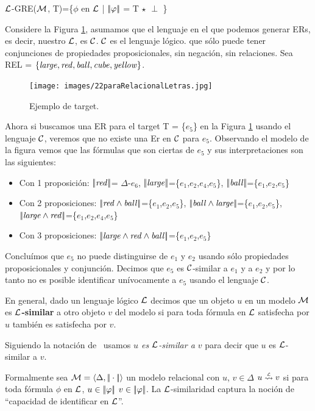 $\mathcal{L}$-GRE($\mathcal{M}$, T)=\{$\phi$ en $\mathcal{L}$ | $|\!|\varphi|\!|$ = T $\star$ $\perp$ \}

Considere la Figura \ref{target_mapa_3ball}, asumamos que el lenguaje en el que podemos generar ERs, es decir, nuestro $\mathcal{L}$, es $\mathcal{C}$. $\mathcal{C}$ es el lenguaje l\'ogico. 
que s\'olo puede tener conjunciones de propiedades proposicionales, 
sin negaci\'on, sin relaciones. Sea REL = $\{\mathit{large}, \mathit{red}, \mathit{ball}, \mathit{cube}, \mathit{yellow} \}$.
\begin{figure}[H]
\centering
\texttt{[image: images/22paraRelacionalLetras.jpg]}
\caption{Ejemplo de target.}
\label{target_mapa_3ball}
\end{figure}

Ahora si buscamos una ER para el target T = \{$e_5$\} en la Figura \ref{target_mapa_3ball} usando el lenguaje $\mathcal{C}$, veremos que no existe una Er en $\mathcal{C}$ para $e_5$. Observando el modelo de la figura vemos que las f\'ormulas que son ciertas de $e_5$ y sus interpretaciones son las siguientes:

\begin{itemize}
\item Con 1 proposici\'on: $|\!|\mathit{red}|\!|$= $\Delta$-$e_6$, $|\!|\mathit{large}|\!|$=\{$e_1$,$e_2$,$e_4$,$e_5$\}, $|\!|\mathit{ball}|\!|$=\{$e_1$,$e_2$,$e_5$\}
\item Con 2 proposiciones: $|\!|\mathit{red} \land \mathit{ball}|\!|$=\{$e_1$,$e_2$,$e_5$\}, $|\!|\mathit{ball} \land \mathit{large}|\!|$=\{$e_1$,$e_2$,$e_5$\}, $|\!|\mathit{large} \land \mathit{red}|\!|$=\{$e_1$,$e_2$,$e_4$,$e_5$\}
\item Con 3 proposiciones: $|\!|\mathit{large} \land \mathit{red} \land \mathit{ball}|\!|$=\{$e_1$,$e_2$,$e_5$\}
\end{itemize}

Conclu\'imos que $e_5$ no puede distinguirse de $e_1$ y $e_2$ usando s\'olo propiedades proposicionales y conjunci\'on. Decimos que $e_5$ es $\mathcal{C}$-similar a $e_1$ y a $e_2$ y por lo tanto no es posible identificar un\'ivocamente a $e_5$ usando el lenguaje $\mathcal{C}$.
\begin{definition}
En general, dado un lenguaje l\'ogico $\mathcal{L}$ decimos que un objeto $u$ en un modelo
$\mathcal{M}$ es {\bf $\mathcal{L}$-similar} a otro objeto
 $v$ del modelo si para toda f\'ormula en $\mathcal{L}$ satisfecha por $u$ tambi\'en es satisfecha por $v$. 
\end{definition}

Siguiendo la notaci\'on de~\cite{areces08} usamos \emph{$u$ es $\mathcal{L}$-similar a $v$} para decir que $u$ es $\mathcal{L}$-similar a $v$.

Formalmente sea $\mathcal{M} = \langle \Delta, |\!|\cdot|\!| \rangle$ un modelo relacional con $u$, $v \in \Delta$
$u \simil{\+L} v$ si para toda f\'ormula $\phi$ en $\mathcal{L}$, $u \in |\!|\varphi|\!|$ \impl
$v \in |\!|\varphi|\!|$. 
La $\mathcal{L}$-similaridad captura la noci\'on de ``capacidad de identificar en $\mathcal{L}$''. 

